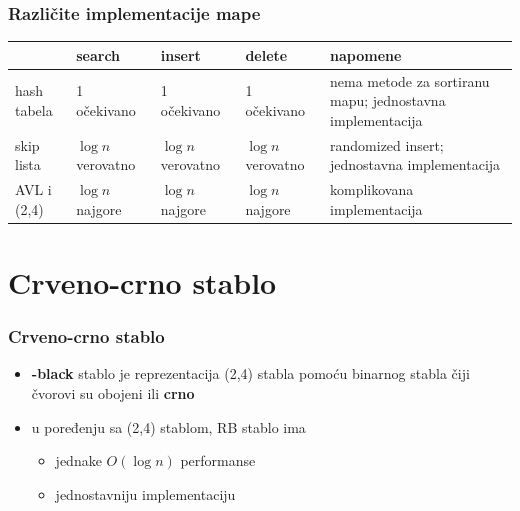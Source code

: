 \documentclass[compress]{beamer}
\begin{document}
\begin{frame}[fragile]
  \frametitle{Različite implementacije mape}
  \begin{tabular}{p{2cm}|p{1cm}|p{1cm}|p{1cm}|p{4cm}}
  & \textbf{search} & \textbf{insert} & \textbf{delete} & \textbf{napomene} \\ \hline\hline
  hash tabela & 1 \mbox{\tiny očekivano} & 1 \mbox{\tiny očekivano} & 1 \mbox{\tiny očekivano} & {\scriptsize nema metode za sortiranu mapu; jednostavna implementacija} \\ \hline
  skip lista & $\log n$ \mbox{\tiny verovatno} & $\log n$ \mbox{\tiny verovatno} & $\log n$ \mbox{\tiny verovatno} & {\scriptsize randomized insert; jednostavna implementacija} \\ \hline
  AVL i (2,4) & $\log n$ \mbox{\tiny najgore} & $\log n$ \mbox{\tiny najgore} & $\log n$ \mbox{\tiny najgore} & {\scriptsize komplikovana implementacija} \\ \hline
  \end{tabular}
\end{frame}

\section[RB stablo]{Crveno-crno stablo}

\begin{frame}[fragile]
  \frametitle{Crveno-crno stablo}
  \begin{itemize}
    \item \textbf{-black} stablo je reprezentacija (2,4) stabla pomoću binarnog stabla čiji čvorovi su obojeni \textbf{} ili \textbf{crno}
    \item u poređenju sa (2,4) stablom, RB stablo ima
    \begin{itemize}
      \item jednake $O(\log n)$ performanse
      \item jednostavniju implementaciju
    \end{itemize}
  \end{itemize}
\end{frame}
\end{document}
